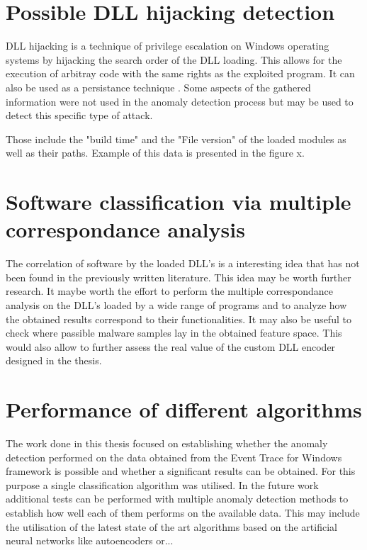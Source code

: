 \documentclass[a4paper,twoside,12pt]{book}
\begin{document}
\section{Possible DLL hijacking detection}

DLL hijacking is a technique of privilege escalation on Windows operating systems by hijacking the 
search order of the DLL loading. This allows for the execution of arbitray code with the same rights 
as the exploited program. It can also be used as a persistance technique \cite{bib:DLLhijacking}.
Some aspects of the gathered information were not used in the anomaly detection process but may be
used to detect this specific type of attack. 

Those include the "build time" and the "File version" of the loaded modules as well as their paths.
Example of this data is presented in the figure x.

\section{Software classification via multiple correspondance analysis}

The correlation of software by the loaded DLL's is a interesting idea that has not been
found in the previously written literature. This idea may be worth further research. It maybe worth
the effort to perform the multiple correspondance analysis on the DLL's loaded by a wide range 
of programs and to analyze how the obtained results correspond to their functionalities. It may also
be useful to check where passible malware samples lay in the obtained feature space. This would also
allow to further assess the real value of the custom DLL encoder designed in the thesis. 

\section{Performance of different algorithms}

The work done in this thesis focused on establishing whether the anomaly detection performed on the
data obtained from the Event Trace for Windows framework is possible and whether a significant results
can be obtained. For this purpose a single classification algorithm was utilised. In the future work 
additional tests can be performed with multiple anomaly detection methods to establish how well each 
of them performs on the available data. This may include the utilisation of the latest state of the 
art algorithms based on the artificial neural networks like autoencoders or...
\end{document}
